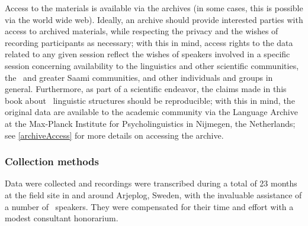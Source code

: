 Access to the materials is available via the archives (in some cases, this is possible via the world wide web). %
Ideally, an archive should provide interested parties with access to archived materials, while respecting the privacy and the wishes of recording participants as necessary; with this in mind, access rights to the data related to any given session reflect the wishes of speakers involved in a specific session concerning availability to the linguistics and other scientific communities, the \PS\ and greater Saami communities, and other individuals and groups in general. %
Furthermore, as part of a scientific endeavor, the claims made in this book about \PS\ linguistic structures should be reproducible; with this in mind, the original data are available to the academic community via the Language Archive at the Max-Planck Institute for Psycholinguistics in Nijmegen, the Netherlands; see \SEC\ref{archiveAccess} for more details on accessing the archive. 


\subsubsection{Collection methods}\label{collectionMethods}
Data were collected and recordings were transcribed during a total of 23 months at the field site in and around Arjeplog, Sweden, %
with the invaluable assistance of a number of \PS\ speakers. They were compensated for their time and effort with a modest consultant honorarium. 

